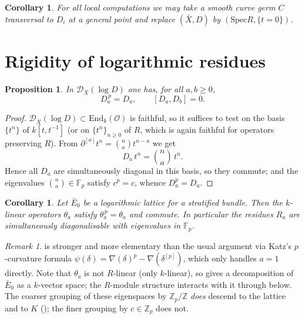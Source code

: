 \documentclass[11pt,reqno]{amsart}
\newcommand{\Zp}{\mathbb{Z}_p}
\newcommand{\Fp}{\mathbb{F}_p}
\newcommand{\ZZ}{\mathbb{Z}}
\newcommand{\cO}{\mathcal{O}}
\newcommand{\cD}{\mathcal{D}}
\newcommand{\End}{\mathrm{End}}
\newcommand{\Spec}{\mathrm{Spec}}
\theoremstyle{plain}
\newtheorem{proposition}[theorem]{Proposition}
\newtheorem{corollary}[theorem]{Corollary}
\theoremstyle{definition}
\theoremstyle{remark}
\newtheorem{remark}[theorem]{Remark}
\numberwithin{equation}{section}
\begin{document}
\begin{corollary}\label{cor:local}
For all local computations we may take a smooth curve germ $C$ transversal
to $D_i$ at a general point and replace $(\bar X,D)$ by
$(\Spec R,\{t=0\})$.
\end{corollary}

\section{Rigidity of logarithmic residues}\label{sec:rigidity}

\begin{proposition}\label{prop:idempotent}
In $\cD_{\bar X}(\log D)$ one has, for all $a,b\ge0$,
\[
   D_a^{\,p}=D_a,\qquad [D_a,D_b]=0 .
\]
\end{proposition}
\begin{proof}
$\cD_{\bar X}(\log D)\subset\End_k(\cO)$ is faithful, so it suffices to
test on the basis $\{t^n\}$ of $k[t,t^{-1}]$ (or on $\{t^n\}_{n\ge0}$ of
$R$, which is again faithful for operators preserving $R$).  From
$\partial^{[a]}t^n=\binom na t^{n-a}$ we get
\[
   D_a\,t^n=\binom{n}{a}\,t^n .
\]
Hence all $D_a$ are simultaneously diagonal in this basis, so they
commute; and the eigenvalues $\binom na\in\Fp$ satisfy $c^p=c$, whence
$D_a^p=D_a$.
\end{proof}

\begin{corollary}\label{cor:rigidity}
Let $\bar E_0$ be a logarithmic lattice for a stratified bundle.  Then the
$k$-linear operators $\theta_a$ satisfy $\theta_a^{\,p}=\theta_a$ and
commute.  In particular the residues $R_a$ are simultaneously
diagonalisable with eigenvalues in $\Fp$.
\end{corollary}

\begin{remark}
 is stronger and more elementary than the usual
argument via Katz's $p$-curvature formula
$\psi(\delta)=\nabla(\delta)^p-\nabla(\delta^{[p]})$, which only handles
$a=1$ directly.  Note that $\theta_a$ is not $R$-linear (only $k$-linear),
so  gives a decomposition of $\bar E_0$ as a
$k$-vector space; the $R$-module structure interacts with it through
 below.  The coarser grouping of these eigenspaces by
$\Zp/\ZZ$ \emph{does} descend to the lattice and to $K$
(); the finer grouping by $c\in\Zp$ does not.
\end{remark}
\end{document}
